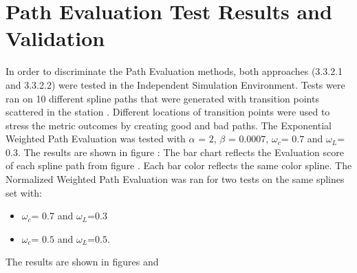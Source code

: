 \section{Path Evaluation Test Results and Validation}
In order to discriminate the Path Evaluation methods,
both approaches (3.3.2.1 and 3.3.2.2) were tested in the Independent Simulation Environment. 
Tests were ran on 10 different spline paths  that were generated with transition points scattered in 
the station .
Different locations of transition points were used to stress the metric outcomes by creating good and bad paths. 
The Exponential Weighted Path Evaluation was tested with \(\alpha\) = \(2\), \(\beta\) = \(0.0007\), 
\(\omega_c\)= \(0.7\) and \(\omega_L\)=\(0.3\).
The results are shown in figure : The bar chart reflects the Evaluation score of each 
spline path from figure . Each bar color reflects the same color spline.
The Normalized Weighted Path Evaluation was ran for two tests on the same splines set with:
\begin{itemize}
    \item \(\omega_c\)= \(0.7\) and \(\omega_L\)=\(0.3\)
    \item \(\omega_c\)= \(0.5\) and \(\omega_L\)=\(0.5\). 
\end{itemize}
 
The results are shown in figures  and 

